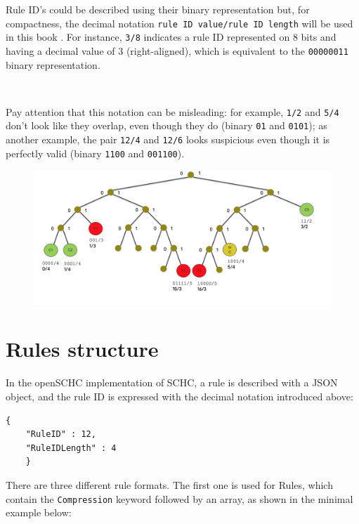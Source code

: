 Rule ID's could be described using their binary representation but, for compactness, the decimal notation \texttt{rule ID value/rule ID length} will be used in this book . For instance, \texttt{3/8} indicates a rule ID represented on 8 bits and having a decimal value of 3 (right-aligned), which is equivalent to the \texttt{00000011} binary representation.

~

Pay attention that this notation can be misleading: for example, \texttt{1/2} and \texttt{5/4} don't look like they overlap, even though they do (binary \texttt{01} and \texttt{0101}); as another example, the pair \texttt{12/4} and \texttt{12/6} looks suspicious even though it is perfectly valid (binary \texttt{1100} and \texttt{001100}).

\begin{figure}[tbp]
\centerline{\includegraphics[width=1\columnwidth]{Pictures/binary-rule.png}}
\label{fig-base64}
\end{figure}

\section{Rules structure}\label{OpenSCHCRules}

In the openSCHC implementation of SCHC, a rule is described with a JSON object, and the rule ID is expressed with the decimal notation introduced above:

\begin{lstlisting}[backgroundcolor=\color{yellow}]
    {
    "RuleID" : 12,
    "RuleIDLength" : 4
    }
\end{lstlisting}

There are three different rule formats. The first one is used for  Rules, which contain the \texttt{Compression} keyword followed by an array, as shown in the minimal example below: 

